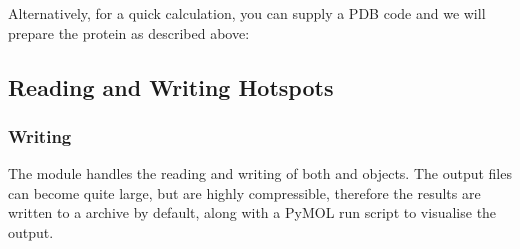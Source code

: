 \documentclass[letterpaper,10pt,english]{sphinxmanual}
\begin{document}
\begin{sphinxVerbatim}[commandchars=\\\{\}]
   

  
  
\end{sphinxVerbatim}

Alternatively, for a quick calculation, you can supply a PDB code and we will prepare the protein as described above:

\begin{sphinxVerbatim}[commandchars=\\\{\}]
  
  
\end{sphinxVerbatim}


\subsection{Reading and Writing Hotspots}
\label{\detokenize{tutorial:reading-and-writing-hotspots}}

\subsubsection{Writing}
\label{\detokenize{tutorial:writing}}
The {\hyperref[\detokenize{hs_io_api:module-hotspots.hs_io}]{}} module handles the reading and writing of both 
and  objects. The output  files can become quite large, but are highly
compressible, therefore the results are written to a  archive by default, along with a PyMOL run script to
visualise the output.

\begin{sphinxVerbatim}[commandchars=\\\{\}]
   

  

     
\end{sphinxVerbatim}
\end{document}

